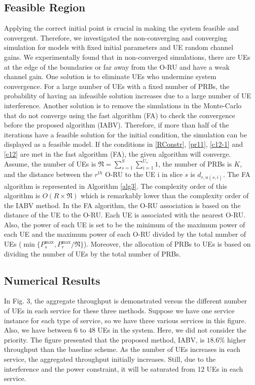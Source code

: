 \documentclass[lettersize,journal]{IEEEtran}
\begin{document}
\subsection{Feasible Region}\label{fr}
Applying the correct initial point is crucial in making the system feasible and convergent.
Therefore, we investigated the non-converging and converging simulation for models with fixed initial parameters and UE random channel gains.
We experimentally found that in non-converged simulations, there are UEs at the edge of the boundaries or far away from the O-RU and have a weak channel gain. One solution is to eliminate UEs who undermine system convergence.
For a large number of UEs with a fixed number of PRBs, the probability of having an infeasible solution increases due to a large number of UE interference.
Another solution is to remove the simulations in the Monte-Carlo that do not converge using the fast algorithm (FA) to check the convergence before
the proposed algorithm (IABV).
Therefore, if more than half of the iterations have a feasible solution for the initial condition, the simulation can be displayed as a feasible model.
If the conditions in \eqref{RConstr}, \eqref{pr11}, \eqref{c12-1} and \eqref{c12} are met in the fast algorithm (FA), the given algorithm will converge.
Assume, the number of UEs is $\mathfrak{N} = \sum_{s=1}^{S}\sum_{i=1}^{U_s}1$,
the number of PRBs is $K$, and the distance between the $r^{th}$ O-RU to the UE i in slice $s$ is $d_{r,u(s,i)}$.
The FA algorithm is represented in Algorithm \ref{alg3}.
The complexity order of this algorithm is $O(R\times \mathfrak{N})$ which is remarkably lower than the complexity order of the IABV method.
In the FA algorithm, the O-RU association is based on the distance of the UE to the O-RU.
Each UE is associated with the nearest O-RU. Also, the power of each UE is set to be the minimum of the maximum power of each UE and the maximum power of each O-RU divided by the total number of UEs ($\min\{P_s^{\max}, P_r^{\max}/\mathfrak{N}\}$).
Moreover, the allocation of PRBs to UEs is based on dividing the number of UEs by the total number of PRBs.
\vspace*{-1.em}
\subsection{Numerical Results}
In Fig. 3, the aggregate throughput is demonstrated versus the different number of UEs in each service for these three methods. Suppose we have one service instance for each type of service, so we have three various services in this figure. Also, we have between 6 to 48 UEs in the system.
Here, we did not consider the priority. The figure presented that the proposed method, IABV, is $18.6\%$ higher throughput than the baseline scheme.
As the number of UEs increases in each service, the aggregated throughput initially increases. Still, due to the interference and the power constraint, it will be saturated from 12 UEs in each service.
\end{document}
